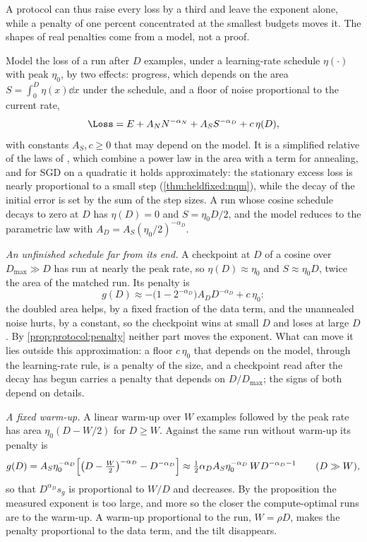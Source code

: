 \begin{refsection}
A protocol can thus raise every loss by a third and leave the exponent alone, while a penalty of one percent concentrated at the smallest budgets moves it. The shapes of real penalties come from a model, not a proof.

\begin{heuristic}
Model the loss of a run after $D$ examples, under a learning-rate schedule $\eta(\cdot)$ with peak $\eta_0$, by two effects: progress, which depends on the area $S=\int_0^D\eta(x)\dd x$ under the schedule, and a floor of noise proportional to the current rate,
\[
\Loss=E+A_NN^{-\alpha_N}+A_SS^{-\alpha_D}+c\,\eta(D),
\]
with constants $A_S,c\ge0$ that may depend on the model. It is a simplified relative of the laws of \textcite{TissueEtAl2025}, which combine a power law in the area with a term for annealing, and for SGD on a quadratic it holds approximately: the stationary excess loss is nearly proportional to a small step (\cref{thm:heldfixed:nqm}), while the decay of the initial error is set by the sum of the step sizes. A run whose cosine schedule decays to zero at $D$ has $\eta(D)=0$ and $S=\eta_0D/2$, and the model reduces to the parametric law with $A_D=A_S(\eta_0/2)^{-\alpha_D}$.

\emph{An unfinished schedule far from its end.} A checkpoint at $D$ of a cosine over $D_{\max}\gg D$ has run at nearly the peak rate, so $\eta(D)\approx\eta_0$ and $S\approx\eta_0D$, twice the area of the matched run. Its penalty is
\[
g(D)\approx-\bigl(1-2^{-\alpha_D}\bigr)A_DD^{-\alpha_D}+c\,\eta_0 :
\]
the doubled area helps, by a fixed fraction of the data term, and the unannealed noise hurts, by a constant, so the checkpoint wins at small $D$ and loses at large $D$. By \cref{prop:protocol:penalty} neither part moves the exponent. What can move it lies outside this approximation: a floor $c\,\eta_0$ that depends on the model, through the learning-rate rule, is a penalty of the size, and a checkpoint read after the decay has begun carries a penalty that depends on $D/D_{\max}$; the signs of both depend on details.

\emph{A fixed warm-up.} A linear warm-up over $W$ examples followed by the peak rate has area $\eta_0(D-W/2)$ for $D\ge W$. Against the same run without warm-up its penalty is
\[
g(D)=A_S\eta_0^{-\alpha_D}\Bigl[\bigl(D-\tfrac W2\bigr)^{-\alpha_D}-D^{-\alpha_D}\Bigr]\approx\tfrac12\alpha_DA_S\eta_0^{-\alpha_D}\,W D^{-\alpha_D-1}\qquad(D\gg W),
\]
so that $D^{\alpha_D}s_g$ is proportional to $W/D$ and decreases. By the proposition the measured exponent is too large, and more so the closer the compute-optimal runs are to the warm-up. A warm-up proportional to the run, $W=\rho D$, makes the penalty proportional to the data term, and the tilt disappears.
\end{heuristic}


\end{refsection}
